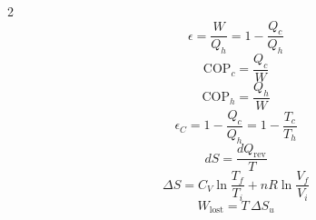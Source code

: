 \begin{multicols*}{2}
\begin{equation*}
    \epsilon = \frac{W}{Q_h} = 1 - \frac{Q_c}{Q_h}
\end{equation*}
\begin{equation*}
    \mathrm{COP}_c = \frac{Q_c}{W}
\end{equation*}
\begin{equation*}
    \mathrm{COP}_h = \frac{Q_h}{W}
\end{equation*}
\begin{equation*}
    \epsilon_C = 1 - \frac{Q_c}{Q_h} = 1 - \frac{T_c}{T_h}
\end{equation*}
\begin{equation*}
    dS = \frac{dQ_\mathrm{rev}}{T}
\end{equation*}
\begin{equation*}
    \Delta S = C_V\ln\frac{T_f}{T_i} + nR\ln\frac{V_f}{V_i}
\end{equation*}
\begin{equation*}
    W_\mathrm{lost} = T\,\Delta S_u
\end{equation*}

\end{multicols*}